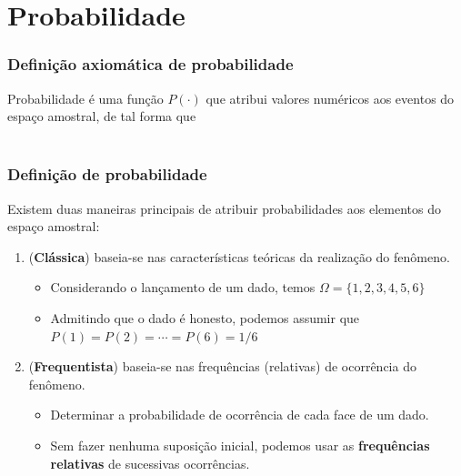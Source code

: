 \documentclass[11pt]{beamer}
\begin{document}
\section{Probabilidade}
\begin{frame}
\frametitle{Definição axiomática de probabilidade}

Probabilidade é uma função \(P(\cdot)\) que atribui valores numéricos
aos eventos do espaço amostral, de tal forma que \\~\\

\begin{enumerate}
\def\labelenumi{\roman{enumi}.}

\end{enumerate}

\end{frame}

\begin{frame}
\frametitle{Definição de probabilidade}

Existem duas maneiras principais de atribuir probabilidades aos
elementos do espaço amostral:

\begin{enumerate}
\def\labelenumi{\arabic{enumi}.}
\item
  (\textbf{Clássica}) baseia-se nas características teóricas da
  realização do fenômeno.

  \begin{itemize}
  \item
    Considerando o lançamento de um dado, temos
    \(\Omega=\{1,2,3,4,5,6\}\)
  \item
    Admitindo que o dado é honesto, podemos assumir que
    \(P(1) = P(2) = \cdots = P(6) = 1/6\)
  \end{itemize}
\item
  (\textbf{Frequentista}) baseia-se nas frequências (relativas) de
  ocorrência do fenômeno.

  \begin{itemize}
  \item
    Determinar a probabilidade de ocorrência de cada face de um dado.
  \item
    Sem fazer nenhuma suposição inicial, podemos usar as
    \textbf{frequências relativas} de sucessivas ocorrências.
  \end{itemize}
\end{enumerate}
\end{frame}
\end{document}
